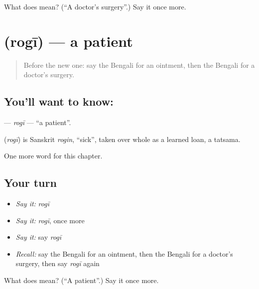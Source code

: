 \begin{tcolorbox}[breakable,colback=teal!4,colframe=teal!35!black,title={Before you move on}]
What does  mean? (\textquotedblleft{}A doctor's surgery\textquotedblright{}.) Say it once more.
\end{tcolorbox}
\section[\texorpdfstring{\bn{রোগী} (rogī)}{রোগী (rogī)}]{ (rogī) — a patient}

\label{lesson:BN-C215-rogi}



\begin{quote}
Before the new one: say the Bengali for an ointment, then the Bengali for a doctor's surgery.
\end{quote}

\subsection*{You'll want to know: }
\textbf{} — \emph{rogī} — \textquotedblleft{}a patient\textquotedblright{}.

\begin{cousinweb}
\textbf{} (\emph{rogī}) is Sanskrit \emph{rogin}, \textquotedblleft{}sick\textquotedblright{}, taken over whole as a learned loan, a tatsama.
\end{cousinweb}

\begin{grammarlens}[title={What you've built}]
One more word for this chapter.
\end{grammarlens}

\subsection*{Your turn}
\begin{itemize}
\raggedright
  \item \emph{Say it:} \emph{rogī}
  \item \emph{Say it:} \emph{rogī}, once more
  \item \emph{Say it:} say \emph{rogī}
  \item \emph{Recall:} say the Bengali for an ointment, then the Bengali for a doctor's surgery, then say \emph{rogī} again
\end{itemize}

\begin{tcolorbox}[breakable,colback=teal!4,colframe=teal!35!black,title={Before you move on}]
What does  mean? (\textquotedblleft{}A patient\textquotedblright{}.) Say it once more.
\end{tcolorbox}

